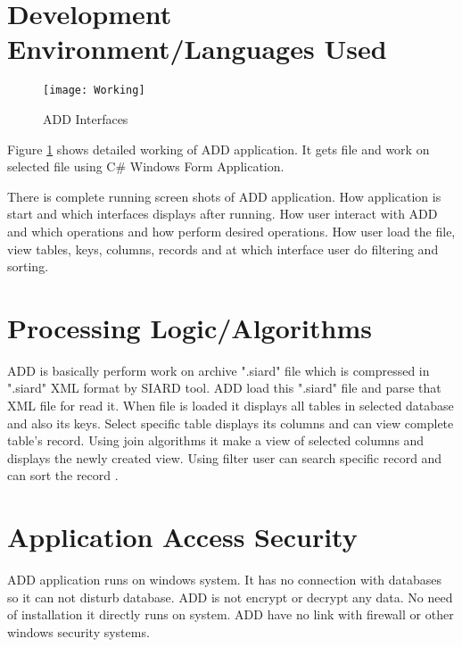 \section{Development Environment/Languages Used}
\begin{figure}[ht]
\centering
\texttt{[image: Working]}
\caption{ADD Interfaces}
\label{fig:ADD Interfaces}
\end{figure}
Figure \ref{fig:ADD Interfaces} shows detailed working of ADD application. It gets file and work on selected file using C\# Windows Form Application. 

\par There is complete running screen shots of ADD application. How application is start and which interfaces displays after running. How user interact with ADD and which operations and how perform desired operations. How user load the file, view tables, keys, columns, records and at which interface user do filtering and sorting.

\section{Processing Logic/Algorithms}
ADD is basically perform work on archive ".siard" file which is compressed in ".siard" XML format by SIARD tool. ADD load this ".siard" file and parse that XML file for read it. When file is loaded it displays all tables in selected database and also its keys. Select specific table displays its columns and can view complete table's record. Using join algorithms it make a view of selected columns and displays the newly created view. Using filter user can search specific record and can sort the record \cite{code}. 

\section{Application Access Security}
ADD application runs on windows system. It has no connection with databases so it can not disturb database. ADD is not encrypt or decrypt any data. No need of installation it directly runs on system. ADD have no link with firewall or other windows security systems. 


 
